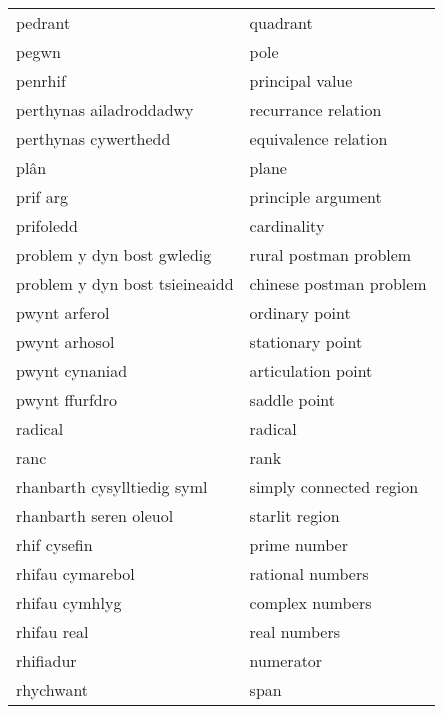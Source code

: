 \begin{supertabular}{p{0.22\textwidth}p{0.22\textwidth}}
                         pedrant &                          quadrant \\
                           pegwn &                              pole \\
                         penrhif &                   principal value \\
         perthynas ailadroddadwy &               recurrance relation \\
            perthynas cywerthedd &              equivalence relation \\
                            plân &                             plane \\
                        prif arg &                principle argument \\
                       prifoledd &                       cardinality \\
      problem y dyn bost gwledig &             rural postman problem \\
  problem y dyn bost tsieineaidd &           chinese postman problem \\
                   pwynt arferol &                    ordinary point \\
                   pwynt arhosol &                  stationary point \\
                  pwynt cynaniad &                articulation point \\
                  pwynt ffurfdro &                      saddle point \\
                         radical &                           radical \\
                            ranc &                              rank \\
     rhanbarth cysylltiedig syml &           simply connected region \\
          rhanbarth seren oleuol &                    starlit region \\
                    rhif cysefin &                      prime number \\
                rhifau cymarebol &                  rational numbers \\
                  rhifau cymhlyg &                   complex numbers \\
                     rhifau real &                      real numbers \\
                       rhifiadur &                         numerator \\
                       rhychwant &                              span \\

\end{supertabular}
